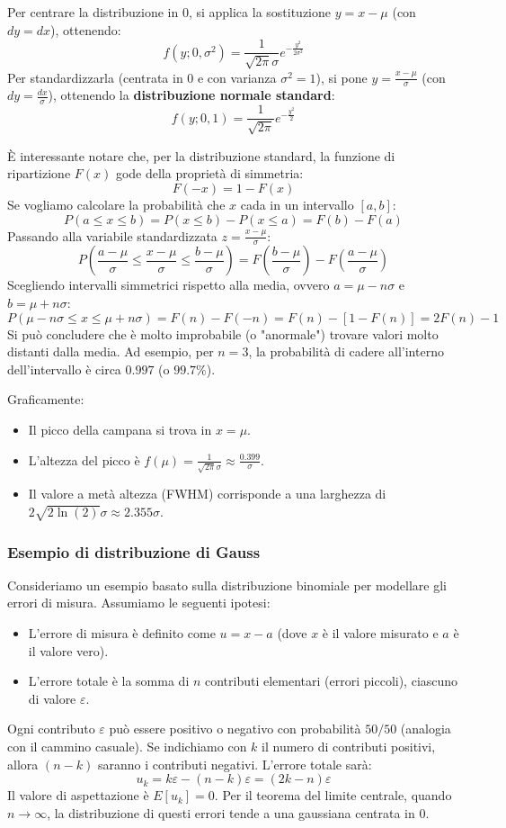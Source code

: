 \documentclass{article}
\theoremstyle{remark}
\begin{document}
Per centrare la distribuzione in $0$, si applica la sostituzione $y=x-\mu$ (con $dy=dx$), ottenendo:
\[
f(y; 0, \sigma^2)=\frac{1}{\sqrt{2\pi}\sigma}e^{-\frac{y^2}{2\sigma^2}}
\]
Per standardizzarla (centrata in $0$ e con varianza $\sigma^2=1$), si pone $y=\frac{x-\mu}{\sigma}$ (con $dy=\frac{dx}{\sigma}$), ottenendo la \textbf{distribuzione normale standard}:
\[
f(y; 0, 1)=\frac{1}{\sqrt{2\pi}}e^{-\frac{y^2}{2}}
\]

È interessante notare che, per la distribuzione standard, la funzione di ripartizione $F(x)$ gode della proprietà di simmetria:
\[
F(-x) = 1 - F(x)
\]
Se vogliamo calcolare la probabilità che $x$ cada in un intervallo $[a,b]$:
\[
P(a\leq x\leq b) = P(x \leq b) - P(x \leq a) = F(b) - F(a)
\]
Passando alla variabile standardizzata $z = \frac{x-\mu}{\sigma}$:
\[
P\left(\frac{a- \mu}{\sigma} \leq \frac{x- \mu}{\sigma} \leq \frac{b- \mu}{\sigma}\right) = F\left(\frac{b- \mu}{\sigma}\right) - F\left(\frac{a- \mu}{\sigma}\right)
\]
Scegliendo intervalli simmetrici rispetto alla media, ovvero $a= \mu - n\sigma$ e $b= \mu + n\sigma$:
\[
P(\mu - n\sigma \leq x \leq \mu + n\sigma) = F(n) - F(-n) = F(n) - [1 - F(n)] = 2F(n) - 1
\]
Si può concludere che è molto improbabile (o "anormale") trovare valori molto distanti dalla media. Ad esempio, per $n=3$, la probabilità di cadere all'interno dell'intervallo è circa $0.997$ (o $99.7\%$).

Graficamente:
\begin{itemize}
    \item Il picco della campana si trova in $x=\mu$.
    \item L'altezza del picco è $f(\mu) = \frac{1}{\sqrt{2\pi}\sigma} \approx \frac{0.399}{\sigma}$.
    \item Il valore a metà altezza (FWHM) corrisponde a una larghezza di $2\sqrt{2 \ln(2)}\sigma \approx 2.355\sigma$.
\end{itemize}    

\subsubsection{\color{red} Esempio di distribuzione di Gauss}
Consideriamo un esempio basato sulla distribuzione binomiale per modellare gli errori di misura.
Assumiamo le seguenti ipotesi:
\begin{itemize}
    \item L'errore di misura è definito come $u = x - a$ (dove $x$ è il valore misurato e $a$ è il valore vero).
    \item L'errore totale è la somma di $n$ contributi elementari (errori piccoli), ciascuno di valore $\varepsilon$.
\end{itemize}
Ogni contributo $\varepsilon$ può essere positivo o negativo con probabilità $50/50$ (analogia con il cammino casuale). Se indichiamo con $k$ il numero di contributi positivi, allora $(n-k)$ saranno i contributi negativi. L'errore totale sarà:
\[
u_k = k\varepsilon - (n-k)\varepsilon = (2k - n)\varepsilon
\]
Il valore di aspettazione è $E[u_k] = 0$. Per il teorema del limite centrale, quando $n \rightarrow \infty$, la distribuzione di questi errori tende a una gaussiana centrata in 0.
\end{document}
